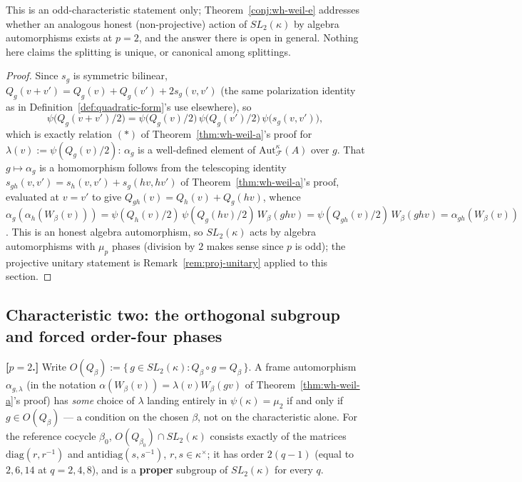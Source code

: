 \begin{scope}
This is an odd-characteristic statement only; Theorem~\ref{conj:wh-weil-e}
addresses whether an analogous honest (non-projective) action of
$SL_2(\kappa)$ by algebra automorphisms exists at $p=2$, and the answer
there is open in general. Nothing here claims the splitting is unique, or
canonical among splittings.
\end{scope}


\begin{proof}
Since $s_g$ is symmetric bilinear, $Q_g(v+v')=Q_g(v)+Q_g(v')+2s_g(v,v')$
(the same polarization identity as in
Definition~\ref{def:quadratic-form}'s use elsewhere), so
\[
\psi\big(Q_g(v+v')/2\big) = \psi\big(Q_g(v)/2\big)\,\psi\big(Q_g(v')/2\big)\,\psi\big(s_g(v,v')\big),
\]
which is exactly relation $(*)$ of Theorem~\ref{thm:wh-weil-a}'s proof for
$\lambda(v):=\psi(Q_g(v)/2)$: $\alpha_g$ is a well-defined element of
$\mathrm{Aut}_{\mathcal{F}}^\kappa(A)$ over $g$. That $g\mapsto\alpha_g$ is a
homomorphism follows from the telescoping identity
$s_{gh}(v,v')=s_h(v,v')+s_g(hv,hv')$ of Theorem~\ref{thm:wh-weil-a}'s proof,
evaluated at $v=v'$ to give $Q_{gh}(v)=Q_h(v)+Q_g(hv)$, whence
$\alpha_g(\alpha_h(W_\beta(v))) = \psi(Q_h(v)/2)\,\psi(Q_g(hv)/2)\,W_\beta(ghv)
= \psi(Q_{gh}(v)/2)\,W_\beta(ghv) = \alpha_{gh}(W_\beta(v))$. This is an
honest algebra automorphism, so $SL_2(\kappa)$ acts by algebra automorphisms
with $\mu_p$ phases (division by $2$ makes sense since $p$ is odd); the
projective unitary statement is Remark~\ref{rem:proj-unitary} applied to
this section.
\end{proof}

\subsection{Characteristic two: the orthogonal subgroup and forced order-four
phases}

\statusProvedConditional
\begin{theorem}
\label{thm:wh-weil-c}
\textbf{[$p=2$.]} Write $O(Q_\beta) := \{\, g\in SL_2(\kappa) : Q_\beta\circ g = Q_\beta \,\}$.
A frame automorphism $\alpha_{g,\lambda}$ (in the notation
$\alpha(W_\beta(v))=\lambda(v)W_\beta(gv)$ of Theorem~\ref{thm:wh-weil-a}'s
proof) has \emph{some} choice of $\lambda$ landing entirely in
$\psi(\kappa)=\mu_2$ if and only if $g\in O(Q_\beta)$ — a condition on the
chosen $\beta$, not on the characteristic alone. For the reference cocycle
$\beta_0$, $O(Q_{\beta_0})\cap SL_2(\kappa)$ consists exactly of the matrices
$\mathrm{diag}(r,r^{-1})$ and $\mathrm{antidiag}(s,s^{-1})$, $r,s\in\kappa^\times$;
it has order $2(q-1)$ (equal to $2,6,14$ at $q=2,4,8$), and is a
\textbf{proper} subgroup of $SL_2(\kappa)$ for every $q$.
\end{theorem}

